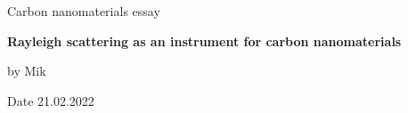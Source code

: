 \begin{titlepage}
    \begin{center}
        \vspace*{1cm}
        \LARGE

        Carbon nanomaterials essay

        \Huge
        \textbf{Rayleigh scattering as an instrument for carbon nanomaterials}

        \vspace{0.5cm}
        \LARGE

        \vspace{1.5cm}

        by Mik

        \vspace{1.5cm}





        \vfill
        \Large
        Date 21.02.2022

    \end{center}
\end{titlepage}

